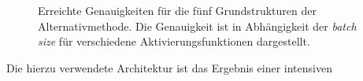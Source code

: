\begin{figure}[h!]
  \hspace{20pt}
  \caption{Erreichte Genauigkeiten für die fünf Grundstrukturen der Alternativmethode. Die Genauigkeit ist in Abhängigkeit der \textit{batch size} für verschiedene Aktivierungsfunktionen dargestellt.}
  \label{fig:accs}
\end{figure}
%
Die hierzu verwendete Architektur ist das Ergebnis einer intensiven
